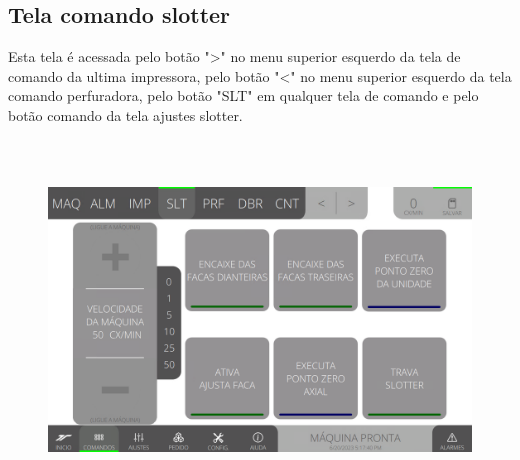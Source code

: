 \thispagestyle{fancy}
\vspace*{40 pt}
\subsection{Tela comando slotter}\label{telaComandoSlotter}
 Esta tela é acessada pelo botão "\textgreater" no menu superior esquerdo da tela de comando da ultima impressora, pelo botão "\textless{}" no menu superior esquerdo da tela comando perfuradora, pelo botão "SLT" em qualquer tela de comando e pelo botão comando da tela ajustes slotter.
 \vspace*{\fill}
 \begin{figure}[h]
  \centering
  \includegraphics[width=576px,height=360px]{src/imagesMiniline/05-Slotter/Commands/e0.png}
\end{figure}
\vspace*{\fill}

\newpage
\thispagestyle{fancy}
\vspace*{40 pt}
